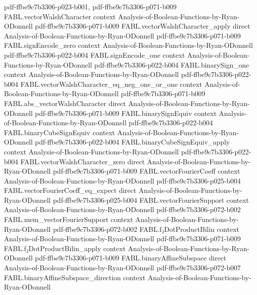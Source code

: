 \begin{theorem}
  {pdf-ffbe9c7b3306-p023-b001,
    pdf-ffbe9c7b3306-p071-b009}
\proofstep
  {FABL.vectorWalshCharacter}
  {context}
  {Analysis-of-Boolean-Functions-by-Ryan-ODonnell}
  {pdf-ffbe9c7b3306-p071-b009}
\proofstep
  {FABL.vectorWalshCharacter_apply}
  {direct}
  {Analysis-of-Boolean-Functions-by-Ryan-ODonnell}
  {pdf-ffbe9c7b3306-p071-b009}
\proofstep
  {FABL.signEncode_zero}
  {context}
  {Analysis-of-Boolean-Functions-by-Ryan-ODonnell}
  {pdf-ffbe9c7b3306-p022-b004}
\proofstep
  {FABL.signEncode_one}
  {context}
  {Analysis-of-Boolean-Functions-by-Ryan-ODonnell}
  {pdf-ffbe9c7b3306-p022-b004}
\proofstep
  {FABL.binarySign_one}
  {context}
  {Analysis-of-Boolean-Functions-by-Ryan-ODonnell}
  {pdf-ffbe9c7b3306-p022-b004}
\proofstep
  {FABL.vectorWalshCharacter_eq_neg_one_or_one}
  {context}
  {Analysis-of-Boolean-Functions-by-Ryan-ODonnell}
  {pdf-ffbe9c7b3306-p071-b009}
\proofstep
  {FABL.abs_vectorWalshCharacter}
  {direct}
  {Analysis-of-Boolean-Functions-by-Ryan-ODonnell}
  {pdf-ffbe9c7b3306-p071-b009}
\proofstep
  {FABL.binarySignEquiv}
  {context}
  {Analysis-of-Boolean-Functions-by-Ryan-ODonnell}
  {pdf-ffbe9c7b3306-p022-b004}
\proofstep
  {FABL.binaryCubeSignEquiv}
  {context}
  {Analysis-of-Boolean-Functions-by-Ryan-ODonnell}
  {pdf-ffbe9c7b3306-p022-b004}
\proofstep
  {FABL.binaryCubeSignEquiv_apply}
  {context}
  {Analysis-of-Boolean-Functions-by-Ryan-ODonnell}
  {pdf-ffbe9c7b3306-p022-b004}
\proofstep
  {FABL.vectorWalshCharacter_zero}
  {direct}
  {Analysis-of-Boolean-Functions-by-Ryan-ODonnell}
  {pdf-ffbe9c7b3306-p071-b009}
\proofstep
  {FABL.vectorFourierCoeff}
  {context}
  {Analysis-of-Boolean-Functions-by-Ryan-ODonnell}
  {pdf-ffbe9c7b3306-p025-b004}
\proofstep
  {FABL.vectorFourierCoeff_eq_expect}
  {direct}
  {Analysis-of-Boolean-Functions-by-Ryan-ODonnell}
  {pdf-ffbe9c7b3306-p025-b004}
\proofstep
  {FABL.vectorFourierSupport}
  {context}
  {Analysis-of-Boolean-Functions-by-Ryan-ODonnell}
  {pdf-ffbe9c7b3306-p072-b002}
\proofstep
  {FABL.mem_vectorFourierSupport}
  {context}
  {Analysis-of-Boolean-Functions-by-Ryan-ODonnell}
  {pdf-ffbe9c7b3306-p072-b002}
\proofstep
  {FABL.f₂DotProductBilin}
  {context}
  {Analysis-of-Boolean-Functions-by-Ryan-ODonnell}
  {pdf-ffbe9c7b3306-p071-b009}
\proofstep
  {FABL.f₂DotProductBilin_apply}
  {context}
  {Analysis-of-Boolean-Functions-by-Ryan-ODonnell}
  {pdf-ffbe9c7b3306-p071-b009}
\proofstep
  {FABL.binaryAffineSubspace}
  {direct}
  {Analysis-of-Boolean-Functions-by-Ryan-ODonnell}
  {pdf-ffbe9c7b3306-p072-b007}
\proofstep
  {FABL.binaryAffineSubspace_direction}
  {context}
  {Analysis-of-Boolean-Functions-by-Ryan-ODonnell}

\end{theorem}
